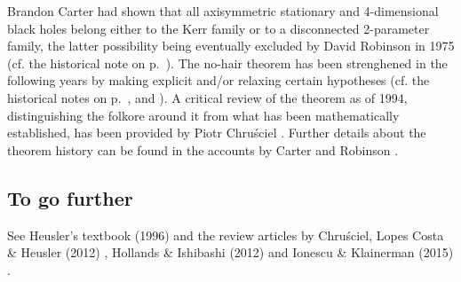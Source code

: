 \begin{hist}
Brandon Carter \cite{Carte71} had shown
that all axisymmetric stationary and 4-dimensional black holes belong either to the
Kerr family or to a disconnected 2-parameter family, the latter possibility
being eventually excluded
by David Robinson in 1975 \cite{Robin75}
(cf. the historical note on p.~\pageref{h:sta:axisym_uniqueness}).
The no-hair theorem has been strenghened in the following years by making explicit
and/or relaxing certain hypotheses (cf. the historical notes on p.~\pageref{h:sta:Israel_thm_vacuum},
\pageref{h:sta:Israel_thm_electrovac} and \pageref{h:sta:axisym_uniqueness}).
A critical review of the theorem as of 1994, distinguishing the folkore around it from what has been mathematically established, has been provided by
Piotr Chru\'sciel \cite{Chrus94}.
Further details about the theorem history can be found in the accounts by Carter \cite{Carte99} and Robinson \cite{Robin09}.
\end{hist}


\subsection{To go further}

See Heusler's textbook (1996) \cite{Heusl96} and the review
articles by Chru\'sciel, Lopes Costa \& Heusler (2012) \cite{ChrusLH12},
Hollands \& Ishibashi (2012) \cite{HollaI12} and
Ionescu \& Klainerman (2015) \cite{IonesK15}.

